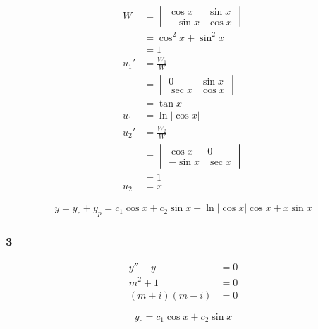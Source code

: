 \documentclass{article}
\begin{document}
\begin{align*}
  W    & = \begin{vmatrix}
             \cos x  & \sin x \\
             -\sin x & \cos x
           \end{vmatrix}    \\
       & = \cos^2 x + \sin^2 x \\
       & = 1                   \\
  u_1' & = \frac{W_1}{W}       \\
       & = \begin{vmatrix}
             0      & \sin x \\
             \sec x & \cos x
           \end{vmatrix}     \\
       & = \tan x              \\
  u_1  & = \ln |\cos x|        \\
  u_2' & = \frac{W_2}{W}       \\
       & = \begin{vmatrix}
             \cos x  & 0      \\
             -\sin x & \sec x
           \end{vmatrix}    \\
       & = 1                   \\
  u_2  & = x
\end{align*}

\[y = y_c + y_p = c_1 \cos x + c_2 \sin x + \ln |\cos x| \cos x + x \sin x\]

\subsubsection{3}

\begin{align*}
  y'' + y         & = 0 \\
  m^2 + 1         & = 0 \\
  (m + i) (m - i) & = 0
\end{align*}

\[y_c = c_1 \cos x + c_2 \sin x\]
\end{document}
